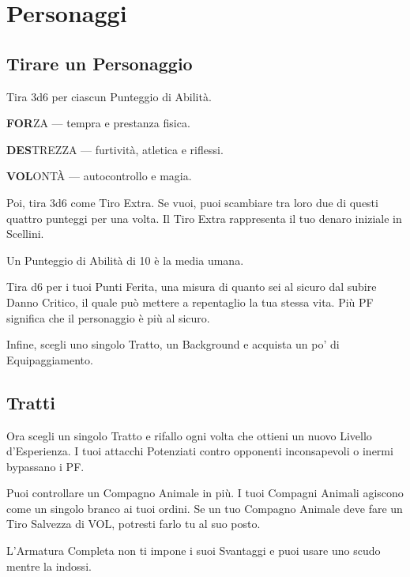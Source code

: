 \documentclass[itdr]{subfiles}
\begin{document}
\chapter{Personaggi}
\label{ch:personaggi}

\section{Tirare un Personaggio}

Tira 3d6 per ciascun Punteggio di Abilità.

\textbf{FOR}ZA --- tempra e prestanza fisica.

\textbf{DES}TREZZA --- furtività, atletica e riflessi.

\textbf{VOL}ONTÀ --- autocontrollo e magia.

Poi, tira 3d6 come Tiro Extra. Se vuoi, puoi scambiare tra loro due di questi quattro punteggi per una volta. Il Tiro Extra rappresenta il tuo denaro iniziale in Scellini.

Un Punteggio di Abilità di 10 è la media umana.

Tira d6 per i tuoi Punti Ferita, una misura di quanto sei al sicuro dal subire Danno Critico, il quale può mettere a repentaglio la tua stessa vita. Più PF significa che il personaggio è più al sicuro.

Infine, scegli uno singolo Tratto, un Background e acquista un po’ di Equipaggiamento.

\section{Tratti}

Ora scegli un singolo Tratto e rifallo ogni volta che ottieni un nuovo Livello d’Esperienza.
\vfill
{}
I tuoi attacchi Potenziati contro opponenti inconsapevoli o inermi bypassano i PF.

\vfill
{}\featmt
Puoi controllare un Compagno Animale in più. I tuoi Compagni Animali agiscono come un singolo branco ai tuoi ordini. Se un tuo Compagno Animale deve fare un Tiro Salvezza di VOL, potresti farlo tu al suo posto.

\vfill
{}
\feathp
L’Armatura Completa non ti impone i suoi Svantaggi e puoi usare uno scudo mentre la indossi.
\end{document}
